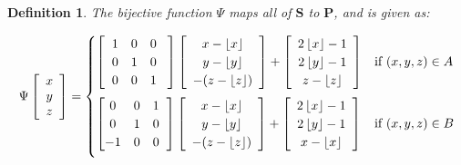 \documentclass[]{article}
\newtheorem{Def}{Definition}[section]
\begin{document}
\begin{Def}
The bijective function $\Psi$ maps all of $\mathbf{S}$ to $\mathbf P$, and is given as:
\end{Def}

\begin{equation}
\Psi\left[\begin{array}{c}
	x\\y\\z
\end{array}\right] 
= 
\begin{cases}
	\left[ \hspace{2mm} \begin{matrix}
		1 & 0 & 0 \\
		0 & 1 & 0 \\
		0 & 0 & 1
	\end{matrix}\hspace{3mm}\right]

	\left[\begin{array}{c}
	x - \left\lfloor x \right\rfloor
	\\ y- \left\lfloor y \right\rfloor
	\\ -(z - \left\lfloor z \right\rfloor)
	\end{array} \right]
	+
	\left[\begin{array}{c}
		2 \left\lfloor x \right\rfloor - 1
		\\ 2\left\lfloor y \right\rfloor - 1
		\\ z - \left\lfloor z \right\rfloor
	\end{array} \right]
		& \text{if } (x,y,z)\in A	\vspace{2mm}
	\\
		
		
	\left[ \begin{matrix}
	0 & 0 & 1 \\
	0 & 1 & 0 \\
	-1 & 0 & 0
	\end{matrix}\hspace{2mm}\right]
	\left[\begin{array}{c}
		x - \left\lfloor x \right\rfloor
		\\ y- \left\lfloor y \right\rfloor
		\\ -(z - \left\lfloor z \right\rfloor)
		\end{array} \right]
	+
		\left[\begin{array}{c}
			2 \left\lfloor x \right\rfloor - 1
			\\ 2\left\lfloor y \right\rfloor - 1
			\\ x - \left\lfloor x \right\rfloor
		\end{array} \right]
			& \text{if } (x,y,z)\in B	\vspace{2mm}
	\\
	

\end{cases}
\end{equation}
\end{document}
